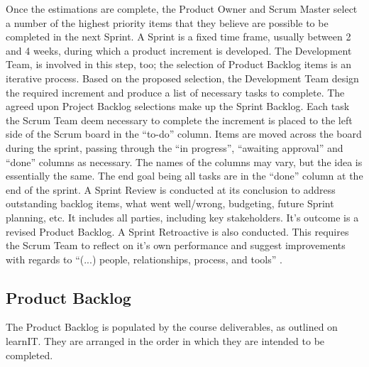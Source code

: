 Once the estimations are complete, the Product Owner and Scrum Master select a number of the highest priority items that they believe are possible to be completed in the next Sprint. A Sprint is a fixed time frame, usually between 2 and 4 weeks, during which a product increment is developed. The Development Team, is involved in this step, too; the selection of Product Backlog items is an iterative process. Based on the proposed selection, the Development Team design the required increment and produce a list of necessary tasks to complete. The agreed upon Project Backlog selections make up the Sprint Backlog. Each task the Scrum Team deem necessary to complete the increment is placed to the left side of the Scrum board in the “to-do” column. Items are moved across the board during the sprint, passing through the “in progress”, “awaiting approval” and “done” columns as necessary. The names of the columns may vary, but the idea is essentially the same. The end goal being all tasks are in the “done” column at the end of the sprint. A Sprint Review is conducted at its conclusion to address outstanding backlog items, what went well/wrong, budgeting, future Sprint planning, etc. It includes all parties, including key stakeholders. It’s outcome is a revised Product Backlog. A Sprint Retroactive is also conducted. This requires the Scrum Team to reflect on it’s own performance and suggest improvements with regards to  “(...) people, relationships, process, and tools” \cite{Schwaber}.
\subsection{Product Backlog}

The Product Backlog is populated by the course deliverables, as outlined on learnIT. They are arranged in the order in which they are intended to be completed.

